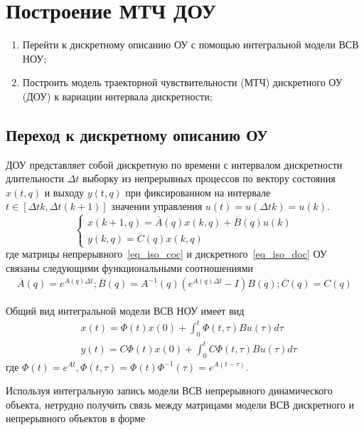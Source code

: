 \section{Построение МТЧ ДОУ}\label{problem_1}

\begin{enumerate}
	\item Перейти к дискретному описанию ОУ с помощью интегральной модели ВСВ НОУ;
	\item Построить модель траекторной чувствительности (МТЧ) дискретного ОУ (ДОУ) к вариации интервала дискретности;
\end{enumerate}


\subsection{Переход к дискретному описанию ОУ}

ДОУ представляет собой дискретную по времени с интервалом дискретности
длительности $\Delta t$ выборку из непрерывных процессов по вектору
состояния $x(t,q)$ и выходу $y(t,q)$ при фиксированном на интервале $t \in \left[\Delta t k, \Delta t(k+1)\right]$ значении управления $u(t) = u(\Delta t k) = u(k)$. 
\begin{equation}\label{eq_iso_doc}
	\begin{cases}
		x(k+1, q) = \overline{A}(q) x(k, q) + \overline{B}(q) u(k)\\
		y(k, q) = \overline{C}(q) x(k, q)
	\end{cases}
\end{equation}
где матрицы непрерывного~\ref{eq_iso_coc} и дискретного~\ref{eq_iso_doc} ОУ связаны следующими функциональными соотношениями
\begin{align}
	\overline{A}(q) = e^{A(q) \Delta t}; \overline{B}(q) = A^{-1}(q)(e^{A(q) \Delta t} - I)B(q); \overline{C}(q) = C(q)
\end{align}



Общий вид интегральной модели ВСВ НОУ имеет вид
\begin{align}
	&x(t) = \Phi (t) x(0) + \int_0^t \Phi (t, \tau) B u(\tau) d \tau \\
	&y(t) = C \Phi (t) x(0) + \int_0^t C \Phi(t, \tau) B u(\tau) d \tau 
\end{align}
где $\Phi(t) = e^{At}, \Phi(t, \tau) = \Phi(t) \Phi^{-1}(\tau) = e^{A(t-\tau)}$.

Используя интегральную запись модели ВСВ непрерывного динамического объекта, нетрудно получить связь между матрицами модели ВСВ дискретного и непрерывного объектов в форме


\newpage